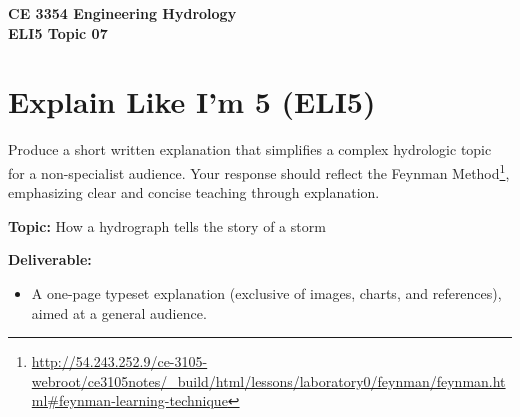 \documentclass[12pt]{article}
\begin{document}
\begin{center}
    \textbf{CE 3354 Engineering Hydrology\\
    ELI5 Topic 07}
\end{center}

\section*{Explain Like I’m 5 (ELI5)}

Produce a short written explanation that simplifies a complex hydrologic topic for a non-specialist audience. Your response should reflect the Feynman Method\footnote{\url{http://54.243.252.9/ce-3105-webroot/ce3105notes/_build/html/lessons/laboratory0/feynman/feynman.html#feynman-learning-technique}}, emphasizing clear and concise teaching through explanation.

\textbf{Topic:} How a hydrograph tells the story of a storm

\textbf{Deliverable:}
\begin{itemize}
    \item A one-page typeset explanation (exclusive of images, charts, and references), aimed at a general audience.
\end{itemize}
\end{document}
